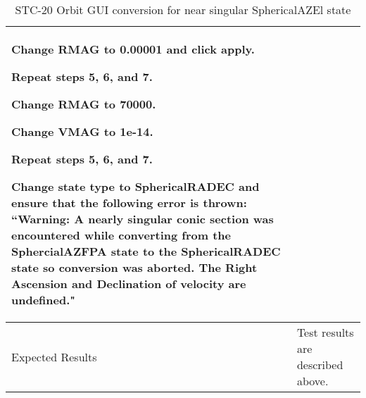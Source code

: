 \begin{table}[htbp!]
\begin{tabular}{|p{1.05 in} |p{4.75 in} |}
\begin{compactenum}
                 \item Change RMAG to 0.00001 and click apply.
                 \item Repeat steps 5, 6, and 7.
                 \item Change RMAG to 70000.
                 \item Change VMAG to 1e-14.
                 \item Repeat steps 5, 6, and 7.
                 \item Change state type to SphericalRADEC and ensure that the following error is thrown: ``Warning: A nearly singular conic section was encountered while converting from the SphercialAZFPA state to the SphericalRADEC state so conversion was aborted.  The Right Ascension and Declination of velocity are undefined."
         \end{compactenum}
         \\ \hline
         Expected Results & Test results are described above.\\
      \hline
      \end{tabular}
      \label{Table:STC-20}
      \caption{STC-20 Orbit GUI conversion for near singular SphericalAZEl state}
\end{table}

